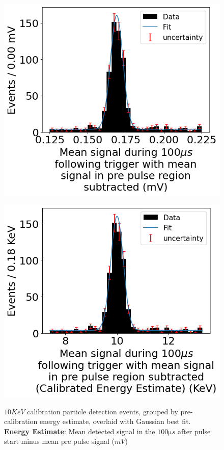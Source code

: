 \begin{figure}[H]
	\begin{minipage}[t]{0.45\linewidth}
		\begin{center}
            \label{fig::area3}
			\includegraphics[width=\textwidth]{figures/area3.png}
			\caption{
                $10\unit{KeV}$ calibration particle detection events, grouped by pre-calibration energy estimate, overlaid with Gaussian best fit.\\
                \textbf{Energy Estimate}: Mean detected signal in the $100\unit{\micro s}$ after pulse start minus mean pre pulse signal  ($\unit{mV}$)
            }
		\end{center}
	\end{minipage}
    \hfill
	\begin{minipage}[t]{0.45\linewidth}
		\begin{center}
            \label{fig::area3--cal}
			\includegraphics[width=\textwidth]{figures/area3--calibrated.png}

\end{center}
\end{minipage}
\end{figure}
